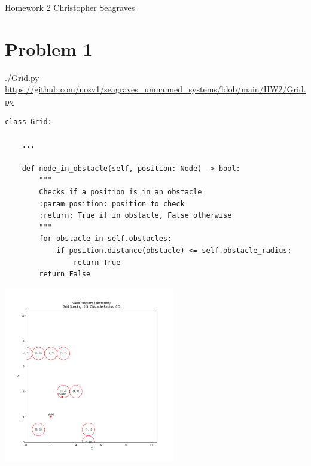 \documentclass{article}
\begin{document}
    \raggedright
    Homework 2 \break
    Christopher Seagraves

    \section*{Problem 1}
    \begin{minipage}{\linewidth}
        \raggedright
        ./Grid.py \break
        \url{https://github.com/nosv1/seagraves_unmanned_systems/blob/main/HW2/Grid.py}
        \begin{lstlisting}
class Grid:

    ...

    def node_in_obstacle(self, position: Node) -> bool:
        """
        Checks if a position is in an obstacle
        :param position: position to check
        :return: True if in obstacle, False otherwise
        """
        for obstacle in self.obstacles:
            if position.distance(obstacle) <= self.obstacle_radius:
                return True
        return False
        \end{lstlisting}
    \end{minipage}
    \includegraphics[height=3in]{HW2P1 Valid Positions.png}
\end{document}
